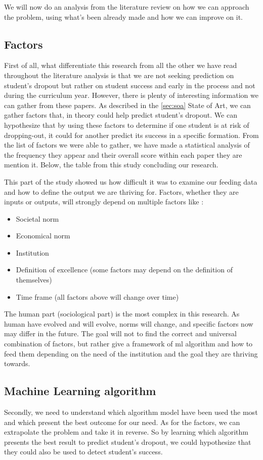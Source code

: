 \documentclass[../main.tex]{subfiles}
\begin{document}
We will now do an analysis from the literature review on how we can approach the problem, using what's been already made and how we can improve on it.

\subsection{Factors}
\label{subsec:analysis_factors}
First of all, what differentiate this research from all the other we have read throughout the literature analysis is that we are not seeking prediction on student's dropout but rather on student success and early in the process and not during the curriculum year. However, there is plenty of interesting information we can gather from these papers. As described in the \ref{sec:soa} State of Art, we can gather factors that, in theory could help predict student's dropout. We can hypothesize that by using these factors to determine if one student is at risk of dropping-out, it could for another predict its success in a specific formation. From the list of factors we were able to gather, we have made a statistical analysis of the frequency they appear and their overall score within each paper they are mention it. Below, the table from this study concluding our research.


This part of the study showed us how difficult it was to examine our feeding data and how to define the output we are thriving for. Factors, whether they are inputs or outputs, will strongly depend on multiple factors like :
\begin{itemize}
    \item Societal norm
    \item Economical norm
    \item Institution
    \item Definition of excellence (some factors may depend on the definition of themselves)
    \item Time frame (all factors above will change over time)
\end{itemize}

The human part (sociological part) is the most complex in this research. As human have evolved and will evolve, norms will change, and specific factors now may differ in the future. 
The goal will not to find the correct and universal combination of factors, but rather give a framework of \acrshort{ml} algorithm and how to feed them depending on the need of the institution and the goal they are thriving towards.

\subsection{Machine Learning algorithm}
\label{subsec:analysis_mlalgo}
Secondly, we need to understand which algorithm model have been used the most and which present the best outcome for our need. As for the factors, we can extrapolate the problem and take it in reverse. So by learning which algorithm presents the best result to predict student's dropout, we could hypothesize that they could also be used to detect student's success. 
\end{document}
